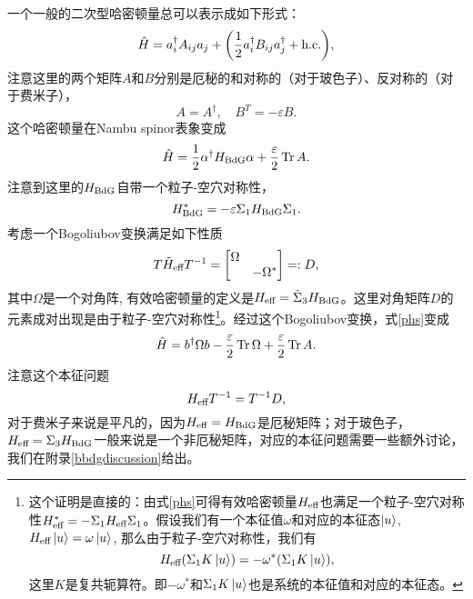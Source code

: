 一个一般的二次型哈密顿量总可以表示成如下形式：
\begin{equation}
  \hat H = a^\dagger_i A_{ij} a_j + \bigg( \frac{1}{2} a^\dagger_i B_{ij} a_j^\dagger + {\text{h.c.}} \bigg),
\end{equation}
注意这里的两个矩阵$A$和$B$分别是厄秘的和对称的（对于玻色子）、反对称的（对于费米子），
\begin{equation}
  A=A^\dagger,\quad B^T=-\varepsilon B.\label{AB}
\end{equation}
这个哈密顿量在Nambu spinor表象变成
\begin{equation}
  \hat H=\frac{1}{2} \alpha^\dagger H_{\text{BdG}} \alpha +\frac{\varepsilon}{2}\Tr A.
\end{equation}
注意到这里的$H_{\text{BdG}}$自带一个粒子-空穴对称性，
\begin{equation}
  H^*_{\text{BdG}}=-\varepsilon \Sigma_1 H_{\text{BdG}} \Sigma_1.\label{phs}
\end{equation}
考虑一个Bogoliubov变换满足如下性质
\begin{equation}
  T\tilde H_{\text{eff}} T^{-1} = \begin{bmatrix}
      \Omega & \\
      & -\Omega^*
  \end{bmatrix}=:D,\label{heffeq}
\end{equation}
其中$\Omega$是一个对角阵, 有效哈密顿量的定义是$H_{\text{eff}} = \tilde\Sigma_3 H_{\text{BdG}}$。这里对角矩阵$D$的元素成对出现是由于粒子-空穴对称性\footnote{这个证明是直接的：由式\eqref{phs}可得有效哈密顿量$H_{\text{eff}}$也满足一个粒子-空穴对称性$H_{\text{eff}}^* = -\Sigma_1 H_{\text{eff}} \Sigma_1$。假设我们有一个本征值$\omega$和对应的本征态$\ket{u}$, $H_{\text{eff}} \ket{u} = \omega \ket{u}$, 那么由于粒子-空穴对称性，我们有
\begin{equation}
  H_{\text{eff}} (\Sigma_1 K \ket{u}) =-\omega^* (\Sigma_1 K\ket{u}),
\end{equation}
这里$K$是复共轭算符。即$-\omega^*$和$\Sigma_1 K\ket{u}$也是系统的本征值和对应的本征态。
}。经过这个Bogoliubov变换，式\eqref{phs}变成
\begin{equation}
  \hat H=b^\dagger \Omega b- \frac{\varepsilon}{2}\Tr \Omega +\frac{\varepsilon}{2}\Tr A.
\end{equation}
注意这个本征问题
\begin{equation}
  H_{\text{eff}} T^{-1} = T^{-1} D,
\end{equation}
对于费米子来说是平凡的，因为$H_{\text{eff}}=H_{\text{BdG}}$是厄秘矩阵；对于玻色子，$H_{\text{eff}}=\Sigma_3 H_{\text{BdG}}$一般来说是一个非厄秘矩阵，对应的本征问题需要一些额外讨论，我们在附录\ref{bbdgdiscussion}给出。

